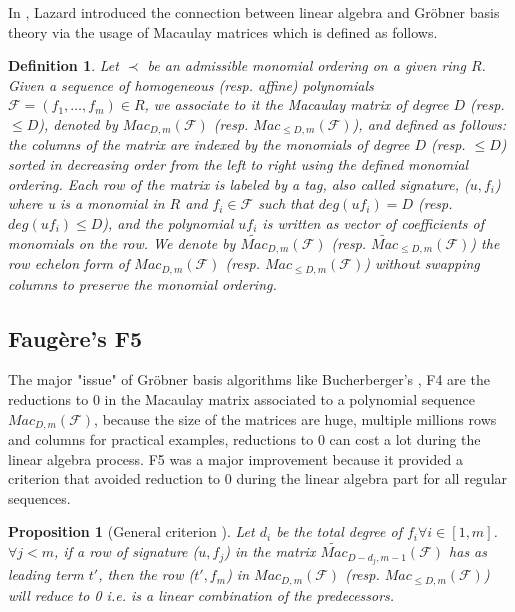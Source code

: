 \documentclass[english]{article}
\newtheorem{proposition}{Proposition}[section]
\newtheorem{definition}{Definition}[section]
\newcommand{\Mac}[3]{{Mac_{#1, #2}(\mathcal{#3})}}
\newcommand{\Mact}[3]{{\widetilde{Mac}_{#1, #2}(\mathcal{#3})}}
\begin{document}
		In \cite{Lazard83}, Lazard introduced the connection between linear algebra and Gröbner basis theory via the usage of Macaulay matrices \cite{Mac} which is defined as follows.
		
		\begin{definition}
			Let $\prec$ be an admissible monomial ordering on a given ring $R$. Given a sequence of homogeneous (resp. affine) polynomials $\mathcal{F} = (f_1,\dots,f_m) \in R$, we associate to it the Macaulay matrix of degree $D$ (resp. $\leq D$), denoted by $\Mac{D}{m}{\mathcal{F}}$ (resp. $\Mac{\leq D}{m}{\mathcal{F}}$), and defined as follows: the columns of the matrix are indexed by the monomials of degree $D$ (resp. $\leq D$) sorted in decreasing order from the left to right using the defined monomial ordering. Each row of the matrix is labeled by a tag, also called signature, ($u, f_i$) where u is a monomial in $R$ and $f_i \in \mathcal{F}$ such that $deg(uf_i) = D$ (resp. $deg(uf_i) \leq D$), and the polynomial $uf_i$ is written as vector of coefficients of monomials on the row. We denote by $\Mact{D}{m}{F}$ (resp. $\Mact{\leq D}{m}{F}$) the row echelon form of $\Mac{D}{m}{\mathcal{F}}$ (resp. $\Mac{\leq D}{m}{\mathcal{F}}$) without swapping columns to preserve the monomial ordering.
		\end{definition}
		
		\subsection{Faugère's F5}
		
		The major "issue" of Gröbner basis algorithms like Bucherberger's \cite{Buc}, F4 \cite{F02} are the reductions to 0 in the Macaulay matrix associated to a polynomial sequence $\Mac{D}{m}{F}$, because the size of the matrices are huge, multiple millions rows and columns for practical examples,
		reductions to 0 can cost a lot during the linear algebra process. F5 \cite{F02} was a major improvement because it provided a criterion that avoided reduction to 0 during the linear algebra part for all regular sequences.
		
		\begin{proposition}[General criterion \cite{F02}]
			\label{F5Crit}
			Let $d_i$ be the total degree of $f_i \forall i \in [1,m]$.
			$\forall j < m$, if a row of signature ($u, f_j$) in the matrix $\Mact{D-d_j}{m-1}{F}$ has as leading term $t'$, then the row ($t', f_m$) in $\Mac{D}{m}{F}$ (resp. $\Mac{\leq D}{m}{F}$) will reduce to 0 i.e. is a linear combination of the predecessors.
		\end{proposition}
		
\end{document}
